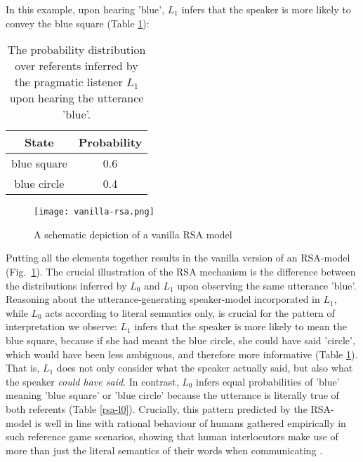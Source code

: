 In this example, upon hearing 'blue', $L_1$ infers that the speaker is more likely to convey the blue square (Table \ref{rsa-l1}):

\begin{table}[h]
	\begin{center}
		\caption{The probability distribution over referents inferred by the pragmatic listener $L_1$ upon hearing the utterance 'blue'.}
		\label{rsa-l1}
		\vskip 0.12in
		\begin{tabular}{cc}
			State & Probability \\
			\hline
			blue square & 0.6 \\
			blue circle & 0.4
		\end{tabular}
	\end{center}
\end{table}
\begin{figure*}[t]
	\begin{center}
		\texttt{[image: vanilla-rsa.png]}
	\end{center}
	\vspace{-0.3cm}
	\caption{A schematic depiction of a vanilla RSA model \parencite{problang}}
	\label{vanilla-rsa}
\end{figure*}
Putting all the elements together results in the vanilla version of an RSA-model (Fig.~\ref{vanilla-rsa}).
The crucial illustration of the RSA mechanism is the difference between the distributions inferred by $L_0$ and $L_1$ upon observing the same utterance 'blue'. Reasoning about the utterance-generating speaker-model incorporated in $L_1$, while $L_0$ acts according to literal semantics only, is crucial for the pattern of interpretation we observe: $L_1$ infers that the speaker is more likely to mean the blue square, because if she had meant the blue circle, she could have said 'circle', which would have been less ambiguous, and therefore more informative (Table \ref{rsa-l1}). That is, $L_1$ does not only consider what the speaker actually said, but also what the speaker \emph{could have said}. In contrast, $L_0$ infers equal probabilities of 'blue' meaning 'blue square' or 'blue circle' because the utterance is literally true of both referents (Table \ref{rsa-l0}). Crucially, this pattern predicted by the RSA-model is well in line with rational behaviour of humans gathered empirically in such reference game scenarios, showing that human interlocutors make use of more than just the literal semantics of their words when communicating \parencite{frank2012predicting, problang}.

